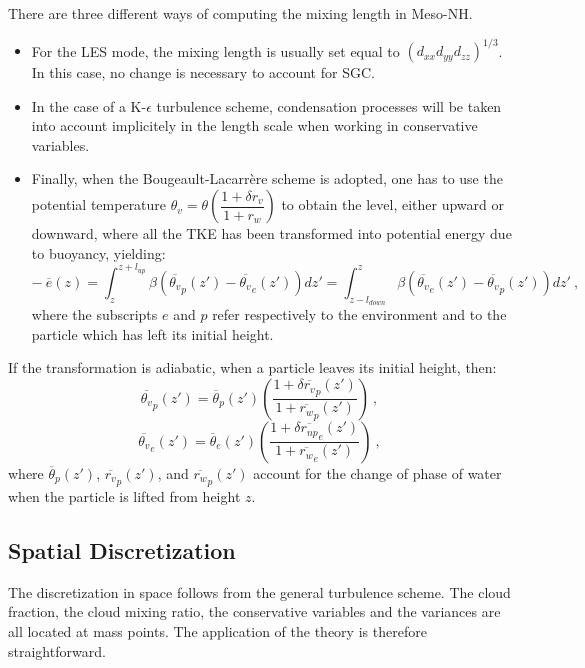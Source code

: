 There are three different ways of computing the mixing length in Meso-NH.
\begin{itemize}
  \item  For the LES mode, the mixing length is usually set
equal to $\left(d_{xx}d_{yy}d_{zz}\right)^{1/3}$.  In this case, no change is
necessary to account for SGC.
  \item  In the case of a K-$\epsilon$ turbulence scheme, condensation
processes will be taken into account implicitely in the length scale
when working in conservative variables.
  \item  Finally, when the Bougeault-Lacarr\`ere
scheme is adopted, one has to use the
potential temperature
$\theta_{v} = \theta \left(\dfrac{1+\delta r_{v}}{1+r_{w}}\right)$ to obtain
the level, either upward or
downward, where all the TKE has been transformed into potential energy due
to buoyancy, yielding:
$$- \: \overline{e}(z) =
\int_{z}^{z+l_{up}} \beta
({\overline{\theta_{v}}}_{p}(z')-{\overline{\theta_{v}}}_{e}(z')) d z' =
\int_{z-l_{down}}^{z} \beta
({\overline{\theta_{v}}}_{e}(z')-{\overline{\theta_{v}}}_{p}(z')) d z'~,$$
where the subscripts $e$ and $p$ refer respectively to the environment and
to the particle which has left its initial height.
\end{itemize}
If the transformation is adiabatic, when a particle leaves its initial height,
then:
\begin{equation}
{\overline{\theta_{v}}}_{p}(z') = {\overline{\theta}}_{p}(z')
\left(\dfrac{1+\delta{\overline{r_{v}}}_{p}(z')}
{1+{\overline{r_{w}}}_{p}(z')}\right)~,
\end{equation}
\begin{equation}
{\overline{\theta_{v}}}_{e}(z') = {\overline{\theta}}_{e}(z')
\left(\dfrac{1+\delta{\overline{r_{np}}}_{e}(z')}
{1+{\overline{r_{w}}}_{e}(z')}\right)~,
\end{equation}
where ${\overline{\theta}}_{p}(z')$, ${\overline{r_{v}}}_{p}(z')$, and
${\overline{r_{w}}}_{p}(z')$ account for the change of phase of water when the
particle is lifted from height $z$.


\subsection{Spatial Discretization}

The discretization in space follows from the general turbulence scheme.
The cloud fraction, the cloud mixing ratio, the conservative variables and
the variances are all located at mass points. The application of the
theory is therefore straightforward.

